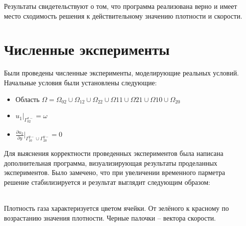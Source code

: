 \documentclass[a4paper, 25pt]{article}
\begin{document}
Результаты свидетельствуют о том, что программа реализована верно и имеет место сходимость решения к действительному значению плотности и скорости.
\newpage

\section {Численные эксперименты}

Были проведены численные эксперименты, моделирующие реальных условий. Начальные условия были установлены следующие:

\begin {itemize}
\item Область $\Omega = \Omega_{02} \cup \Omega_{12} \cup \Omega_{22} \cup \Omega{11} \cup \Omega{21} \cup \Omega{10} \cup \Omega_{20}$
  \item $u_1|_{\Gamma_{02}^{x-}} = \omega$
  \item $\frac{{\partial}u_2}{{\partial}y}|_{\Gamma_{10}^{y-}\cup\Gamma_{20}^{y-}} = 0$
\end   {itemize}

Для выяснения корректности проведенных экспериментов была написана дополнительная программа, визуализирующая результаты проделанных экспериментов. Было замечено, что при увеличении временного парметра решение стабилизируется и результат выглядит следующим образом: \\
\begin{figure}[h!]
\end{figure}
\\
Плотность газа характеризуется цветом ячейки. От зелёного к красному по возрастанию значения плотности. Черные палочки -- вектора скорости.
\end{document}

